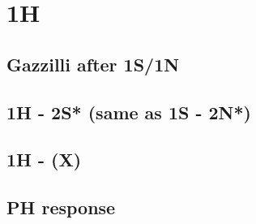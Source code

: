 \section{1H}


\subsection{Gazzilli after 1S/1N}


\subsection{1H - 2S* (same as 1S - 2N*)}


\subsection{1H - (X)}


\subsection{PH response}


